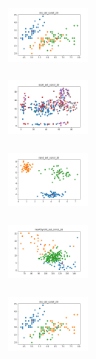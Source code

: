 \vspace*{\fill}
\newpage
\vspace*{\fill}

\begin{figure}[H]    
    \centering
    \begin{subfigure}
        \centering
        \includegraphics[width=0.234\textwidth]{img/am10/iris_set_const_20_949004259_clust.png}
    \end{subfigure}
    \hfill
    \begin{subfigure}
        \centering
        \includegraphics[width=0.234\textwidth]{img/am10/ecoli_set_const_20_949004259_clust.png}
    \end{subfigure}
    \hfill
    \begin{subfigure}
        \centering
        \includegraphics[width=0.234\textwidth]{img/am10/rand_set_const_20_949004259_clust.png}
    \end{subfigure}
    \hfill
    \begin{subfigure}
        \centering
        \includegraphics[width=0.234\textwidth]{img/am10/newthyroid_set_const_20_949004259_clust.png}
    \end{subfigure}
    \hfill
    \begin{subfigure}
        \centering
        \includegraphics[width=0.234\textwidth]{img/am10/iris_set_const_20_589741062_clust.png}

\end{subfigure}
\end{figure}
